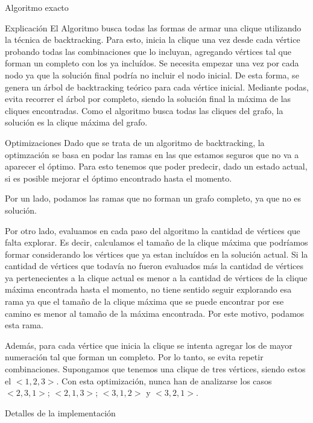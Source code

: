 \begin{section}{Algoritmo exacto}
		\begin{subsection}{Explicación}
			El Algoritmo busca todas las formas de armar una clique utilizando la técnica de backtracking. Para esto, inicia la clique una vez desde cada vértice probando todas las combinaciones que lo incluyan, agregando vértices tal que forman un completo con los ya incluídos. Se necesita empezar una vez por cada nodo ya que la solución final podría no incluir el nodo inicial. De esta forma, se genera un árbol de backtracking teórico para cada vértice inicial. Mediante podas, evita recorrer el árbol por completo, siendo la solución final la máxima de las cliques encontradas. Como el algoritmo busca todas las cliques del grafo, la solución es la clique máxima del grafo.

		\begin{subsubsection}{Optimizaciones}
			Dado que se trata de un algoritmo de backtracking, la optimzación se basa en podar las ramas en las que estamos seguros que no va a aparecer el óptimo. Para esto tenemos que poder predecir, dado un estado actual, si es posible mejorar el óptimo encontrado hasta el momento.
			
			Por un lado, podamos las ramas que no forman un grafo completo, ya que no es solución.
			
			Por otro lado, evaluamos en cada paso del algoritmo la cantidad de vértices que falta explorar. Es decir, calculamos el tamaño de la clique máxima que podríamos formar considerando los vértices que ya estan incluídos en la solución actual. Si la cantidad de vértices que todavía no fueron evaluados más la cantidad de vértices ya pertenecientes a la clique actual es menor a la cantidad de vértices de la clique máxima encontrada hasta el momento, no tiene sentido seguir explorando esa rama ya que el tamaño de la clique máxima que se puede encontrar por ese camino es menor al tamaño de la máxima encontrada. Por este motivo, podamos esta rama.

			Además, para cada vértice que inicia la clique se intenta agregar los de mayor numeración tal que forman un completo. Por lo tanto, se evita repetir combinaciones. Supongamos que tenemos una clique de tres vértices, siendo estos el $<1,2,3>$. Con esta optimización, nunca han de analizarse los casos $<2,3,1>$; $<2,1,3>$; $<3,1,2>$ y $<3,2,1>$.
		\end{subsubsection}

		\end{subsection}
		\begin{subsection}{Detalles de la implementación}
			

\end{subsection}
\end{section}
